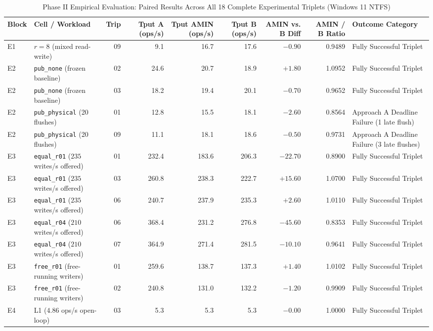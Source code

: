 \documentclass[conference]{IEEEtran}
\begin{document}
\begin{table}[t]
\caption{Phase II Empirical Evaluation: Paired Results Across All 18 Complete Experimental Triplets (Windows 11 NTFS)}
\label{tab:phase2_triplets}
\centering
\footnotesize
\setlength{\tabcolsep}{3.5pt}
\begin{tabular}{@{}llrrrrrrl@{}}
\toprule
\textbf{Block} & \textbf{Cell / Workload} & \textbf{Trip} & \textbf{Tput A (ops/s)} & \textbf{Tput AMIN (ops/s)} & \textbf{Tput B (ops/s)} & \textbf{AMIN vs. B Diff} & \textbf{AMIN / B Ratio} & \textbf{Outcome Category} \\
\midrule
E1 & $r=8$ (mixed read-write) & 09 & 9.1 & 16.7 & 17.6 & $-0.90$ & 0.9489 & Fully Successful Triplet \\
E2 & \texttt{pub\_none} (frozen baseline) & 02 & 24.6 & 20.7 & 18.9 & $+1.80$ & 1.0952 & Fully Successful Triplet \\
E2 & \texttt{pub\_none} (frozen baseline) & 03 & 18.2 & 19.4 & 20.1 & $-0.70$ & 0.9652 & Fully Successful Triplet \\
E2 & \texttt{pub\_physical} (20 flushes) & 01 & 12.8 & 15.5 & 18.1 & $-2.60$ & 0.8564 & Approach A Deadline Failure (1 late flush) \\
E2 & \texttt{pub\_physical} (20 flushes) & 09 & 11.1 & 18.1 & 18.6 & $-0.50$ & 0.9731 & Approach A Deadline Failure (3 late flushes) \\
E3 & \texttt{equal\_r01} ($235$ writes/s offered) & 01 & 232.4 & 183.6 & 206.3 & $-22.70$ & 0.8900 & Fully Successful Triplet \\
E3 & \texttt{equal\_r01} ($235$ writes/s offered) & 03 & 260.8 & 238.3 & 222.7 & $+15.60$ & 1.0700 & Fully Successful Triplet \\
E3 & \texttt{equal\_r01} ($235$ writes/s offered) & 06 & 240.7 & 237.9 & 235.3 & $+2.60$ & 1.0110 & Fully Successful Triplet \\
E3 & \texttt{equal\_r04} ($210$ writes/s offered) & 06 & 368.4 & 231.2 & 276.8 & $-45.60$ & 0.8353 & Fully Successful Triplet \\
E3 & \texttt{equal\_r04} ($210$ writes/s offered) & 07 & 364.9 & 271.4 & 281.5 & $-10.10$ & 0.9641 & Fully Successful Triplet \\
E3 & \texttt{free\_r01} (free-running writers) & 01 & 259.6 & 138.7 & 137.3 & $+1.40$ & 1.0102 & Fully Successful Triplet \\
E3 & \texttt{free\_r01} (free-running writers) & 02 & 240.8 & 131.0 & 132.2 & $-1.20$ & 0.9909 & Fully Successful Triplet \\
E4 & L1 ($4.86$ ops/s open-loop) & 03 & 5.3 & 5.3 & 5.3 & $-0.00$ & 1.0000 & Fully Successful Triplet \\

\end{tabular}
\end{table}
\end{document}
